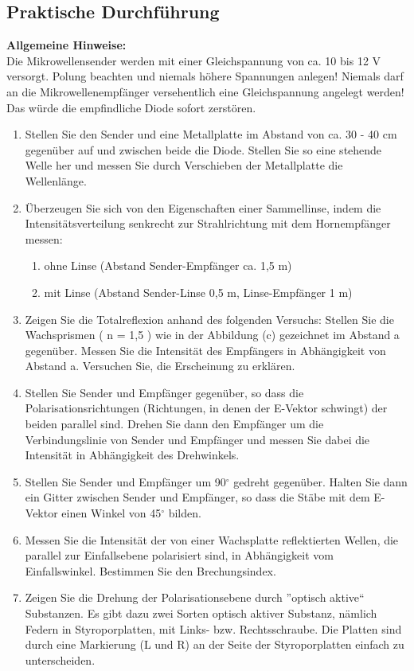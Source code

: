 \documentclass[12pt]{scrartcl}
\begin{document}
\subsection{Praktische Durchführung}
\textbf{Allgemeine Hinweise:}\\
Die Mikrowellensender werden mit einer Gleichspannung von ca. 10 bis 12 V versorgt.
Polung beachten und niemals höhere Spannungen anlegen! Niemals darf an die Mikrowellenempfänger versehentlich eine Gleichspannung angelegt werden! Das würde die empfindliche Diode sofort zerstören.
\begin{enumerate}
\item Stellen Sie den Sender und eine Metallplatte im Abstand von ca. 30 - 40 cm gegenüber auf und zwischen beide die Diode. Stellen Sie so eine stehende Welle her
und messen Sie durch Verschieben der Metallplatte die Wellenlänge.
\item
Überzeugen Sie sich von den Eigenschaften einer Sammellinse, indem die Intensitätsverteilung senkrecht zur Strahlrichtung mit dem Hornempfänger messen:
\begin{enumerate}
\item ohne Linse (Abstand Sender-Empfänger ca. 1,5 m)
\item mit Linse (Abstand Sender-Linse 0,5 m, Linse-Empfänger 1 m)
\end{enumerate}
\item Zeigen Sie die Totalreflexion anhand des folgenden Versuchs:
Stellen Sie die Wachsprismen ( n = 1,5 ) wie in der Abbildung (c) gezeichnet im Abstand a gegenüber. Messen Sie die Intensität des Empfängers in Abhängigkeit von Abstand a. Versuchen Sie, die Erscheinung zu erklären.
\item Stellen Sie Sender und Empfänger gegenüber, so dass die Polarisationsrichtungen
(Richtungen, in denen der E-Vektor schwingt) der beiden parallel sind. Drehen Sie dann den Empfänger um die Verbindungslinie von Sender und Empfänger und messen Sie dabei die Intensität in Abhängigkeit des Drehwinkels.
\item Stellen Sie Sender und Empfänger um 90$^{\circ}$ gedreht gegenüber. Halten Sie dann ein Gitter zwischen Sender und Empfänger, so dass die Stäbe mit dem E-Vektor einen Winkel von 45$^{\circ}$ bilden.
\item Messen Sie die Intensität der von einer Wachsplatte reflektierten Wellen, die parallel zur Einfallsebene polarisiert sind, in Abhängigkeit vom Einfallswinkel. Bestimmen Sie den Brechungsindex.
\item Zeigen Sie die Drehung der Polarisationsebene durch ”optisch aktive“ Substanzen. Es gibt dazu zwei Sorten optisch aktiver Substanz, nämlich Federn in Styroporplatten, mit Links- bzw. Rechtsschraube. Die Platten sind durch eine Markierung (L und R) an der Seite der Styroporplatten einfach zu unterscheiden.
\end{enumerate}
\end{document}
